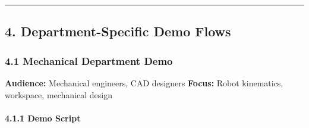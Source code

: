 \documentclass[
]{article}
\begin{document}
\begin{center}\rule{0.5\linewidth}{0.5pt}\end{center}

\hypertarget{department-specific-demo-flows}{%
\subsection{4. Department-Specific Demo
Flows}\label{department-specific-demo-flows}}

\hypertarget{mechanical-department-demo}{%
\subsubsection{4.1 Mechanical Department
Demo}\label{mechanical-department-demo}}

\textbf{Audience:} Mechanical engineers, CAD designers \textbf{Focus:}
Robot kinematics, workspace, mechanical design

\hypertarget{demo-script}{%
\paragraph{4.1.1 Demo Script}\label{demo-script}}
\end{document}
